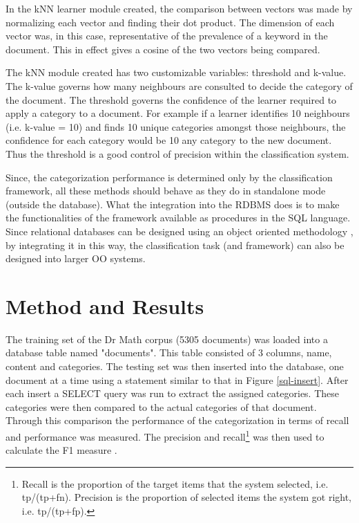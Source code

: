 \documentclass[twocolumn]{article}
\begin{document}
In the kNN learner module created, the comparison between vectors was made by 
normalizing each vector and 
finding their dot product. The dimension of each vector was, in this case, 
representative of the prevalence of a keyword in the document. This in effect gives a 
cosine of the two vectors being compared. 

The kNN module created has two customizable variables: threshold and k-value. The 
k-value governs how many neighbours are consulted to decide the category of the 
document. The threshold governs the confidence of the learner required to apply a 
category to a document. For example if a learner identifies 10 neighbours (i.e. k-value 
= 10) and finds 10 unique categories amongst those neighbours, the confidence for 
each category would be 10%
any category to the new document. Thus the threshold is a good control of precision 
within the classification system.

Since, the categorization performance is determined only by the classification 
framework, all these methods should behave as they do in standalone mode (outside 
the database). What the integration into the RDBMS does is to make the 
functionalities of the framework available as procedures in the SQL language.
Since relational databases can be designed using an object oriented methodology \cite{blaha:88,
rumbaugh:91}, by integrating it in this way, the classification task 
(and framework) can also be designed into larger OO systems.

\section{Method and Results}

The training set of the Dr Math corpus (5305 documents) was loaded into a database 
table named "documents". This table consisted of 3 columns, name, content and 
categories. The testing set was then inserted into the database, one document at a time 
using a statement similar to that in Figure \ref{sql-insert}. After each insert a SELECT query was 
run to extract the assigned categories. These categories were then compared to the 
actual categories of that document. Through this comparison the performance of the 
categorization in terms of recall  and performance  was measured. The precision and 
recall\footnote{Recall is the proportion of the target items that the
system selected, i.e. tp/(tp+fn).  Precision is the proportion of
selected items the system got right, i.e. tp/(tp+fp).} was then used
to calculate the F1 measure \cite{calvo:01,sebastiani:02}.
\end{document}
